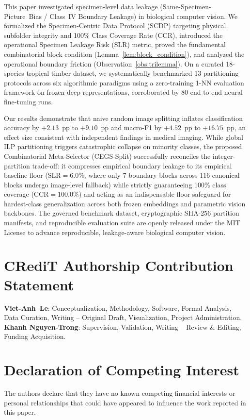 \documentclass[a4paper,fleqn]{cas-sc}
\begin{document}
This paper investigated specimen-level data leakage (\mbox{Same-Specimen-Picture Bias} / Class~IV Boundary Leakage) in biological computer vision. We formalized the Specimen-Centric Data Protocol (SCDP) targeting physical subfolder integrity and 100\% Class Coverage Rate ($\mathrm{CCR}$), introduced the operational Specimen Leakage Risk ($\mathrm{SLR}$) metric, proved the fundamental combinatorial block condition (Lemma~\ref{lem:block_condition}), and analyzed the operational boundary friction (Observation~\ref{obs:trilemma}). On a curated 18-species tropical timber dataset, we systematically benchmarked 13 partitioning protocols across six algorithmic paradigms using a zero-training 1-NN evaluation framework on frozen deep representations, corroborated by 80 end-to-end neural fine-tuning runs.

Our results demonstrate that naive random image splitting inflates classification accuracy by $+2.13$~pp to $+9.10$~pp and macro-F1 by $+4.52$~pp to $+16.75$~pp, an effect size consistent with independent findings in medical imaging. While global ILP partitioning triggers catastrophic collapse on minority classes, the proposed Combinatorial Meta-Selector (CEGS-Split) successfully reconciles the integer-partition trade-off: it compresses empirical boundary leakage to its empirical baseline floor ($\mathrm{SLR} = 6.0\%$, where only 7 boundary blocks across 116 canonical blocks undergo image-level fallback) while strictly guaranteeing 100\% class coverage ($\mathrm{CCR} = 100.0\%$) and acting as an indispensable floor safeguard for hardest-class generalization across both frozen embeddings and parametric vision backbones. The governed benchmark dataset, cryptographic SHA-256 partition manifests, and reproducible evaluation suite are openly released under the MIT License to advance reproducible, leakage-aware biological computer vision.

\section*{CRediT Authorship Contribution Statement}
\textbf{\mbox{Viet-Anh Le}}: Conceptualization, Methodology, Software, Formal Analysis, Data Curation, Writing -- Original Draft, Visualization, Project Administration.
\textbf{Khanh Nguyen-Trong}: Supervision, Validation, Writing -- Review \& Editing, Funding Acquisition.

\section*{Declaration of Competing Interest}
The authors declare that they have no known competing financial interests or personal relationships that could have appeared to influence the work reported in this paper.
\end{document}
